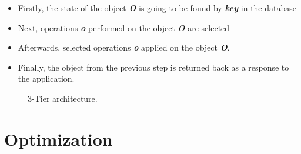 \begin{itemize}
\item Firstly, the state of the object \textit{\textbf{O}} is going to be found by \textit{\textbf{key}} in the database
\item Next, operations \textit{\textbf{o}} performed on the object \textit{\textbf{O}} are selected
\item Afterwards, selected operations \textit{\textbf{o}} applied on the object \textit{\textbf{O}}.
\item Finally, the object from the previous step is returned back as a response to the application.
\end{itemize} 


\begin{figure}[!htb]
    \begin{center}
    \def\svgwidth{\linewidth}
    
    \caption {3-Tier architecture.}
    \label{fig:dev1}
\end{center}
\end{figure}



\section{Optimization}